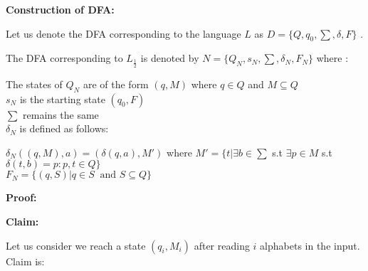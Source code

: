 \documentclass[12pt,a4paper]{article}
\begin{document}






\textbf{Construction of DFA:}

Let us denote the DFA corresponding to the language $L$ as $D=\{Q,q_0,\sum,\delta,F\}$ . 

The DFA corresponding to $L_\frac{1}{2}$ is denoted by $N=\{Q_N,s_N,\sum,\delta_N,F_N\}$ where :
\begin{center}
    The states of $Q_N$ are of the form $(q,M)$ where $q \in Q$ and $M \subseteq Q$\\
    $s_N$ is the starting state $(q_0,F)$\\
    $\sum $ remains the same \\
    $\delta_N$ is defined as follows:
    
    
    $\delta_N((q,M),a)=(\delta(q,a),M')$ where $M'=\{t  | \exists b \in \sum $ s.t $\exists p \in M$ s.t $\delta(t,b)=p : p,t \in Q\}$
    \\
    $F_N=\{(q,S) | q \in S \ \text{ and } S \subseteq Q\}$
    
\end{center}

\textbf{Proof:}

\textbf{Claim:}

Let us consider we reach a state $(q_i,M_i)$ after reading $i$ alphabets in the input. Claim is:
\end{document}
